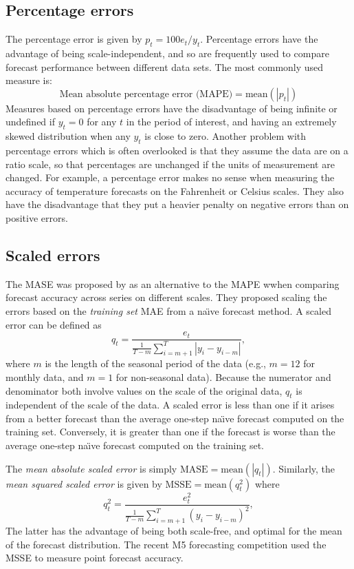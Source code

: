 \documentclass[a4paper,10pt]{article}
\def\mean{\text{mean}}
\begin{document}
\subsection*{Percentage errors}

The percentage error is given by $p_t = 100 e_t/y_t$. Percentage errors have the advantage of being scale-independent, and so are frequently used to compare forecast performance between different
data sets. The most commonly used measure is:
\[
  \text{Mean absolute percentage error (MAPE)} = \mean(|p_{t}|)
\]
Measures based on percentage errors have the disadvantage of being infinite or undefined if $y_t=0$ for any $t$ in the period of interest, and having an extremely skewed distribution when any $y_t$ is close to zero. Another problem with percentage errors which is often overlooked is that they assume the data are on a ratio scale, so that percentages are unchanged if the units of measurement are changed. For example, a percentage error makes no sense when measuring the accuracy of temperature forecasts on the Fahrenheit or Celsius scales. They also have the disadvantage that they put a heavier penalty on negative errors than on positive errors.

\subsection*{Scaled errors}

The MASE was proposed by \citet{HK06} as an alternative to the MAPE wwhen comparing forecast accuracy across series on different scales. They proposed scaling the errors based on the \emph{training set} MAE from a na\"{\i}ve forecast method. A scaled error can be defined as
\[
  q_t = \frac{e_t}{\displaystyle\frac{1}{T-m}\sum_{i=m+1}^T |y_i-y_{i-m}|},
\]
where $m$ is the length of the seasonal period of the data (e.g., $m=12$ for monthly data, and $m=1$ for non-seasonal data). Because the numerator and denominator both involve values on the scale of the original data, $q_t$ is independent of the scale of the data. A scaled error is less than one if it arises from a better forecast than the average one-step na\"{\i}ve forecast computed on the training set. Conversely, it is greater than one if the forecast is worse than the average one-step na\"{\i}ve forecast computed on the training set.

The \emph{mean absolute scaled error} is simply $\text{MASE} = \mean(|q_t|)$. Similarly, the \emph{mean squared scaled error} is given by $\text{MSSE} = \mean(q_t^2)$ where
$$
  q_t^2 = \frac{e_t^2}{\displaystyle\frac{1}{T-m}\sum_{i=m+1}^T (y_i-y_{i-m})^2},
$$
The latter has the advantage of being both scale-free, and optimal for the mean of the forecast distribution. The recent M5 forecasting competition used the MSSE \citep{M5accuracy} to measure point forecast accuracy.



\end{document}
